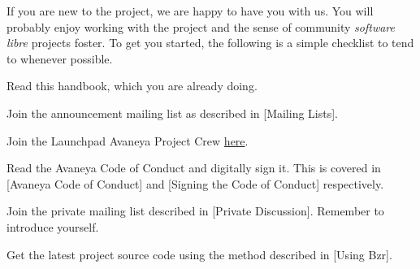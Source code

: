 

If you are new to the project, we are happy to have you with us. You will probably enjoy working with the project and the sense of community {\it software libre} projects foster. To get you started, the following is a simple checklist to tend to whenever possible.

\usesymbols[mvs]
\startitemize[1]
\item
Read this handbook, which you are already doing.

\item
Join the announcement mailing list as described in [Mailing Lists].

\item
Join the Launchpad Avaneya Project Crew \href{https://launchpad.net/~avaneya/+join}{here}.

\item
Read the Avaneya Code of Conduct and digitally sign it. This is covered in [Avaneya Code of Conduct] and [Signing the Code of Conduct] respectively.

\item
Join the private mailing list described in [Private Discussion]. Remember to introduce yourself.

\item
Get the latest project source code using the method described in [Using Bzr].
\stopitemize


